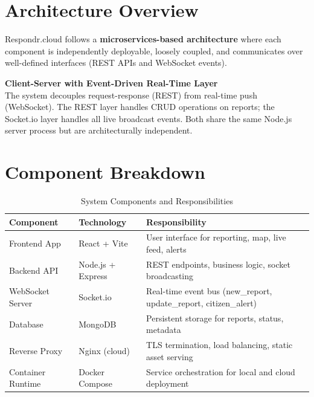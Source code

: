 \documentclass[12pt, a4paper]{report}
\begin{document}
\section{Architecture Overview}

Respondr.cloud follows a \textbf{microservices-based architecture} where each component is independently deployable, loosely coupled, and communicates over well-defined interfaces (REST APIs and WebSocket events).

\begin{infobox}
  \textbf{Client-Server with Event-Driven Real-Time Layer}\\[4pt]
  The system decouples request-response (REST) from real-time push (WebSocket). The REST layer handles CRUD operations on reports; the Socket.io layer handles all live broadcast events. Both share the same Node.js server process but are architecturally independent.
\end{infobox}

\section{Component Breakdown}

\begin{table}[H]
  \centering
  \caption{System Components and Responsibilities}
  \begin{tabularx}{\textwidth}{l >{\ttfamily\footnotesize}l X}
    \toprule
    \rowcolor{headerrow!20}
    \textbf{Component} & \textbf{Technology} & \textbf{Responsibility} \\
    \midrule
    Frontend App      & React + Vite      & User interface for reporting, map, live feed, alerts \\
    \rowcolor{rowshade}
    Backend API       & Node.js + Express & REST endpoints, business logic, socket broadcasting \\
    WebSocket Server  & Socket.io         & Real-time event bus (new\_report, update\_report, citizen\_alert) \\
    \rowcolor{rowshade}
    Database          & MongoDB           & Persistent storage for reports, status, metadata \\
    Reverse Proxy     & Nginx (cloud)     & TLS termination, load balancing, static asset serving \\
    \rowcolor{rowshade}
    Container Runtime & Docker Compose    & Service orchestration for local and cloud deployment \\
    \bottomrule
  \end{tabularx}
\end{table}
\end{document}
